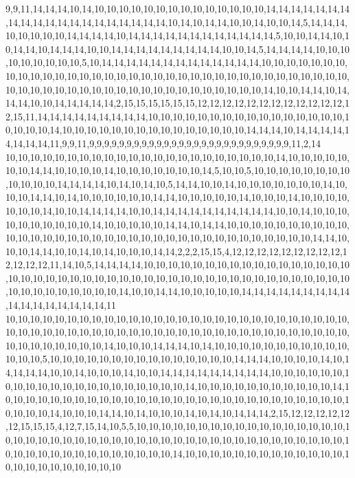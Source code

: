 9,9,11,14,14,14,10,14,10,10,10,10,10,10,10,10,10,10,10,10,10,10,14,14,14,14,14,14,14,14,14,14,14,14,14,14,14,14,14,14,14,14,10,14,10,14,14,10,10,14,10,10,14,5,14,14,14,10,10,10,10,10,14,14,14,14,10,14,14,14,14,14,14,14,14,14,14,14,14,5,10,10,14,14,10,10,14,14,10,14,14,14,10,10,14,14,14,14,14,14,14,14,14,10,10,14,5,14,14,14,14,10,10,10,10,10,10,10,10,10,5,10,14,14,14,14,14,14,14,14,14,14,14,14,14,10,10,10,10,10,10,10,10,10,10,10,10,10,10,10,10,10,10,10,10,10,10,10,10,10,10,10,10,10,10,10,10,10,10,10,10,10,10,10,10,10,10,10,10,10,10,10,10,10,10,10,10,10,10,10,10,14,10,10,14,14,10,14,14,14,10,10,14,14,14,14,14,2,15,15,15,15,15,15,12,12,12,12,12,12,12,12,12,12,12,12,12,15,11,14,14,14,14,14,14,14,14,14,10,10,10,10,10,10,10,10,10,10,10,10,10,10,10,10,10,10,10,10,14,10,10,10,10,10,10,10,10,10,10,10,10,10,10,10,14,14,14,10,14,14,14,14,14,14,14,14,11,9,9,11,9,9,9,9,9,9,9,9,9,9,9,9,9,9,9,9,9,9,9,9,9,9,9,9,9,9,9,11,2,14
10,10,10,10,10,10,10,10,10,10,10,10,10,10,10,10,10,10,10,10,10,10,14,10,10,10,10,10,10,10,14,14,10,10,10,10,14,10,10,10,10,10,10,10,14,5,10,10,5,10,10,10,10,10,10,10,10,10,10,10,10,14,14,14,14,10,14,10,14,10,5,14,14,10,10,14,10,10,10,10,10,10,10,14,10,10,10,14,14,10,14,10,10,10,10,10,10,14,14,10,10,10,10,10,14,10,10,10,14,10,10,10,10,10,10,10,14,10,10,14,14,14,14,10,10,14,14,14,14,14,14,14,14,14,14,10,10,14,10,10,10,10,10,10,10,10,10,10,14,10,10,10,10,10,14,14,10,14,14,10,10,10,10,10,10,10,10,10,10,10,10,10,10,10,10,10,10,10,10,10,10,10,10,10,10,10,10,10,10,10,10,10,10,10,14,14,10,10,10,14,14,10,10,14,10,14,10,10,10,14,14,2,2,2,15,15,4,12,12,12,12,12,12,12,12,12,12,12,12,12,11,14,10,5,14,14,14,14,10,10,10,10,10,10,10,10,10,10,10,10,10,10,10,10,10,10,10,10,10,10,10,10,10,10,10,10,10,10,10,10,10,10,10,10,10,10,10,10,10,10,10,10,10,10,10,10,10,10,10,10,10,10,14,10,10,14,14,10,10,10,10,10,14,14,14,14,14,14,14,14,14,14,14,14,14,14,14,14,14,11
10,10,10,10,10,10,10,10,10,10,10,10,10,10,10,10,10,10,10,10,10,10,10,10,10,10,10,10,10,10,10,10,10,10,10,10,10,10,10,10,10,10,10,10,10,10,10,10,10,10,10,10,10,10,10,10,10,10,10,10,10,10,10,10,14,10,10,10,14,14,14,10,14,10,10,10,10,10,10,10,10,10,10,10,10,10,10,5,10,10,10,10,10,10,10,10,10,10,10,10,10,10,10,14,14,14,10,10,10,10,14,10,14,14,14,14,10,10,14,10,10,10,14,10,10,14,14,14,14,14,14,14,14,14,10,10,10,10,10,10,10,10,10,10,10,10,10,10,10,10,10,10,10,10,10,14,10,10,10,10,10,10,10,10,10,10,10,14,10,10,10,10,10,10,10,10,10,10,10,10,10,10,10,10,10,10,10,10,10,10,10,10,10,10,10,10,10,10,10,10,14,10,10,10,14,14,10,14,10,10,10,14,10,14,10,14,14,14,2,15,12,12,12,12,12,12,15,15,15,4,12,7,15,14,10,5,5,10,10,10,10,10,10,10,10,10,10,10,10,10,10,10,10,10,10,10,10,10,10,10,10,10,10,10,10,10,10,10,10,10,10,10,10,10,10,10,10,10,10,10,10,10,10,10,10,10,10,10,10,10,10,10,10,10,10,10,14,10,10,10,10,10,10,10,10,10,10,10,10,10,10,10,10,10,10,10,10,10,10,10
